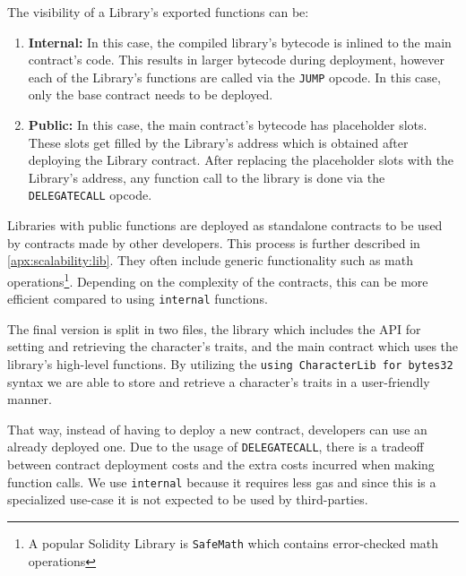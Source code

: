 The visibility of a Library's exported functions can be: 
\begin{enumerate}
    \item \textbf{Internal:}
        In this case, the compiled library's bytecode is inlined to the main contract's code. This results in larger bytecode during deployment, however each of the Library's functions are called via the \texttt{JUMP} opcode. In this case, only the base contract needs to be deployed.
    \item \textbf{Public:}
        In this case, the main contract's bytecode has placeholder slots. These slots get filled by the Library's address which is obtained after deploying the Library contract. After replacing the placeholder slots with the Library's address, any function call to the library is done via the \texttt{DELEGATECALL} opcode.
\end{enumerate}


Libraries with public functions are deployed as standalone contracts to be used by contracts made by other developers. This process is further described in \ref{apx:scalability:lib}. They often include generic functionality such as math operations\footnote{A popular Solidity Library is \texttt{SafeMath} which contains error-checked math operations}. Depending on the complexity of the contracts, this can be more efficient compared to using \texttt{internal} functions. %

The final version is split in two files, the library which includes the API for setting and retrieving the character's traits, and the main contract which uses the library's high-level functions. By utilizing the \texttt{using CharacterLib for bytes32} syntax we are able to store and retrieve a character's traits in a user-friendly manner.


That way, instead of having to deploy a new contract, developers can use an already deployed one. Due to the usage of \texttt{DELEGATECALL}, there is a tradeoff between contract deployment costs and the extra costs incurred when making function calls. We use \texttt{internal} because it requires less gas and since this is a specialized use-case it is not expected to be used by third-parties.

